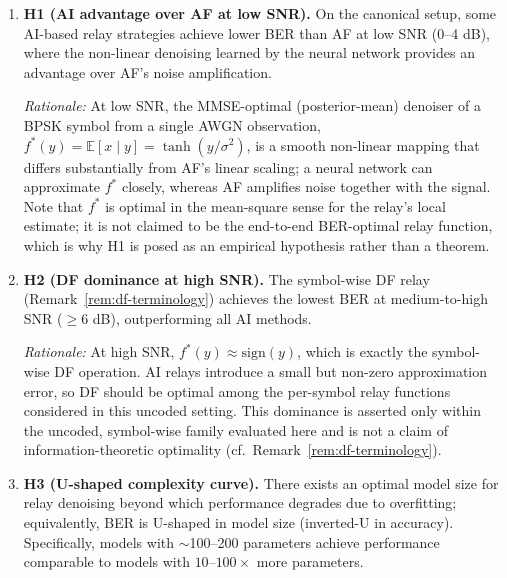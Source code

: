 \begin{enumerate}
    \item \textbf{H1 (AI advantage over AF at low SNR).} On the canonical setup, some AI-based relay strategies achieve lower BER than AF at low SNR (0--4 dB), where the non-linear denoising learned by the neural network provides an advantage over AF's noise amplification.

\emph{Rationale:} At low SNR, the MMSE-optimal (posterior-mean) denoiser of a BPSK symbol from a single AWGN observation, $f^*(y) = \mathbb{E}[x \mid y] = \tanh(y/\sigma^2)$, is a smooth non-linear mapping that differs substantially from AF's linear scaling; a neural network can approximate $f^*$ closely, whereas AF amplifies noise together with the signal. Note that $f^*$ is optimal in the mean-square sense for the relay's local estimate; it is not claimed to be the end-to-end BER-optimal relay function, which is why H1 is posed as an empirical hypothesis rather than a theorem.

\item \textbf{H2 (DF dominance at high SNR).} The symbol-wise DF relay (Remark~\ref{rem:df-terminology}) achieves the lowest BER at medium-to-high SNR ($\geq 6$ dB), outperforming all AI methods.

\emph{Rationale:} At high SNR, $f^*(y) \approx \text{sign}(y)$, which is exactly the symbol-wise DF operation. AI relays introduce a small but non-zero approximation error, so DF should be optimal among the per-symbol relay functions considered in this uncoded setting. This dominance is asserted only within the uncoded, symbol-wise family evaluated here and is not a claim of information-theoretic optimality (cf.\ Remark~\ref{rem:df-terminology}).

\item \textbf{H3 (U-shaped complexity curve).} There exists an optimal model size for relay denoising beyond which performance degrades due to overfitting; equivalently, BER is U-shaped in model size (inverted-U in accuracy). Specifically, models with $\sim$100--200 parameters achieve performance comparable to models with $10$--$100\times$ more parameters.


\end{enumerate}
